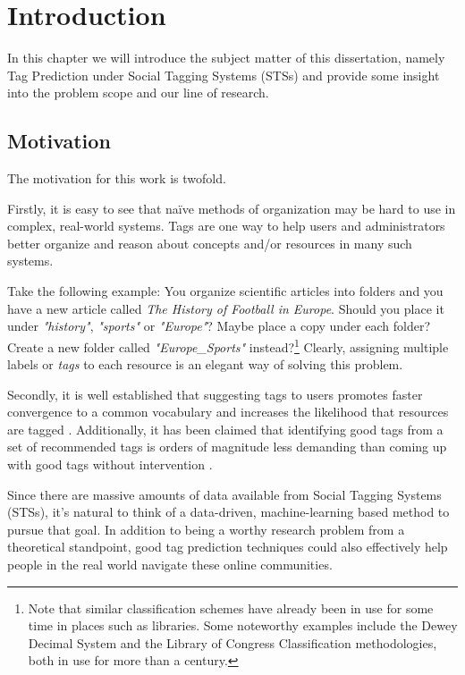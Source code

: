 \chapter{Introduction}\label{chap:intro}

In this chapter we will introduce the subject matter of this dissertation, namely Tag Prediction under Social Tagging Systems (STSs) and provide some insight into the problem scope and our line of research.

\section{Motivation}\label{section:intro_motivation}

The motivation for this work is twofold. 

Firstly, it is easy to see that naïve methods of organization may be hard to use in complex, real-world systems. Tags are one way to help users and administrators better organize and reason about concepts and/or resources in many such systems.

Take the following example: You organize scientific articles into folders and you have a new article called \textit{The History of Football in Europe}. Should you place it under \textit{"history"}, \textit{"sports"} or \textit{"Europe"}? Maybe place a copy under each folder? Create a new folder called \textit{"Europe\_Sports"} instead?\footnote{Note that similar classification schemes have already been in use for some time in places such as libraries. Some noteworthy examples include the Dewey Decimal System and the Library of Congress Classification methodologies, both in use for more than a century.} Clearly, assigning multiple labels or \textit{tags} to each resource is an elegant way of solving this problem.

Secondly, it is well established that suggesting tags to users promotes faster convergence to a common vocabulary \citep{marlow_etal_2006,hassan_etal_2009, dattolo_etal_2010} and increases the likelihood that resources are tagged \citep{dattolo_etal_2010,floeck_etal_2010}. Additionally, it has been claimed that identifying good tags from a set of recommended tags is orders of magnitude less demanding than coming up with good tags without intervention \citep{marinho_etal_2012}.

Since there are massive amounts of data available from Social Tagging Systems (STSs), it's natural to think of a data-driven, machine-learning based method to pursue that goal. In addition to being a worthy research problem from a theoretical standpoint, good tag prediction techniques could also effectively help people in the real world navigate these online communities.

